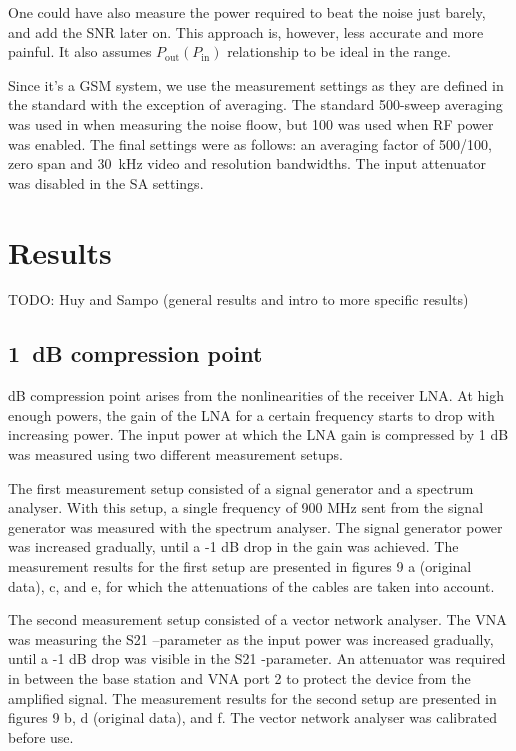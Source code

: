\documentclass[a4paper, 12pt]{article}
\begin{document}
One could have also measure the power required to beat the noise just barely, and 
add the SNR later on. This approach is, however, less accurate and more painful. It 
also assumes $P_\mathrm{out}(P_\mathrm{in})$ relationship to be ideal in the range.

Since it's a GSM system, we use the measurement settings as they are defined in 
the standard with the exception of averaging. The standard 500-sweep averaging was 
used in when measuring the noise floow, but 100 was used when RF power was enabled. 
The final settings were as follows: an averaging factor of 500/100, zero span and 
30~kHz video and resolution bandwidths. The input attenuator was disabled in the 
SA settings.


\newpage
\section{Results}

TODO: Huy and Sampo (general results and intro to more specific results)


\subsection{1~dB compression point}

 dB compression point arises from the nonlinearities of the receiver LNA. At high enough powers, the gain of the LNA for a certain frequency starts to drop with increasing power. The input power at which the LNA gain is compressed by 1 dB was measured using two different measurement setups.

The first measurement setup consisted of a signal generator and a spectrum analyser. With this setup, a single frequency of 900 MHz sent from the signal generator was measured with the spectrum analyser. The signal generator power was increased gradually, until a -1 dB drop in the gain was achieved. The measurement results for the first setup are presented in figures 9 a (original data), c, and e, for which the attenuations of the cables are taken into account.

The second measurement setup consisted of a vector network analyser. The VNA was measuring the S21 –parameter as the input power was increased gradually, until a -1 dB drop was visible in the S21 -parameter. An attenuator was required in between the base station and VNA port 2 to protect the device from the amplified signal. The measurement results for the second setup are presented in figures 9 b, d (original data), and f. The vector network analyser was calibrated before use. 
\end{document}
